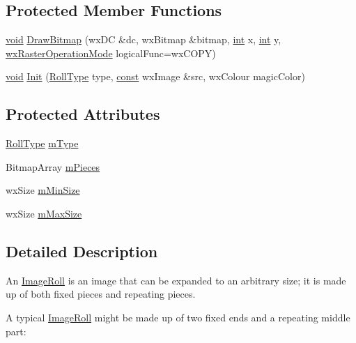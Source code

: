 \subsection*{Protected Member Functions}
\begin{DoxyCompactItemize}
\item 
\hyperlink{sound_8c_ae35f5844602719cf66324f4de2a658b3}{void} \hyperlink{class_image_roll_ae4b10916c2817a5f077381b13c33408a}{Draw\+Bitmap} (wx\+DC \&dc, wx\+Bitmap \&bitmap, \hyperlink{xmltok_8h_a5a0d4a5641ce434f1d23533f2b2e6653}{int} x, \hyperlink{xmltok_8h_a5a0d4a5641ce434f1d23533f2b2e6653}{int} y, \hyperlink{_image_roll_8h_a3bd7816d34a03863743710178ff6be2d}{wx\+Raster\+Operation\+Mode} logical\+Func=wx\+C\+O\+PY)
\item 
\hyperlink{sound_8c_ae35f5844602719cf66324f4de2a658b3}{void} \hyperlink{class_image_roll_a1b025c98f9b64d0d7153768a657849af}{Init} (\hyperlink{class_image_roll_a82fea9dd1b4fa9e6a864c3b3ca6ced2e}{Roll\+Type} type, \hyperlink{getopt1_8c_a2c212835823e3c54a8ab6d95c652660e}{const} wx\+Image \&src, wx\+Colour magic\+Color)
\end{DoxyCompactItemize}
\subsection*{Protected Attributes}
\begin{DoxyCompactItemize}
\item 
\hyperlink{class_image_roll_a82fea9dd1b4fa9e6a864c3b3ca6ced2e}{Roll\+Type} \hyperlink{class_image_roll_ae09d3c9bff4cf0bb47d623ac427c9fb4}{m\+Type}
\item 
Bitmap\+Array \hyperlink{class_image_roll_abda9941c78abfe466308df2fff3f69fc}{m\+Pieces}
\item 
wx\+Size \hyperlink{class_image_roll_a22362f6b655ee5bdad4a742d50ddb0f2}{m\+Min\+Size}
\item 
wx\+Size \hyperlink{class_image_roll_ac9896fe08df31541c8b632266662e731}{m\+Max\+Size}
\end{DoxyCompactItemize}


\subsection{Detailed Description}
An \hyperlink{class_image_roll}{Image\+Roll} is an image that can be expanded to an arbitrary size; it is made up of both fixed pieces and repeating pieces. 

A typical \hyperlink{class_image_roll}{Image\+Roll} might be made up of two fixed ends and a repeating middle part\+:

